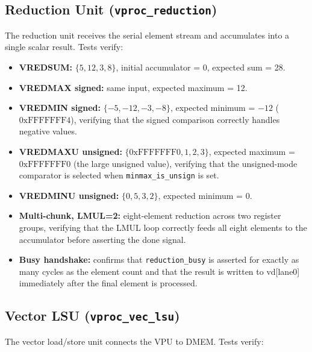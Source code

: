 \subsection{Reduction Unit (\texttt{vproc\_reduction})}

The reduction unit receives the serial element stream and accumulates into a single
scalar result. Tests verify:

\begin{itemize}
  \item \textbf{VREDSUM:} $\{5, 12, 3, 8\}$, initial accumulator = 0, expected sum = 28.
  \item \textbf{VREDMAX signed:} same input, expected maximum = 12.
  \item \textbf{VREDMIN signed:} $\{-5, -12, -3, -8\}$, expected minimum = $-12$
        ($0\mathrm{xFFFFFFF4}$), verifying that the signed comparison correctly handles
        negative values.
  \item \textbf{VREDMAXU unsigned:} $\{0\mathrm{xFFFFFFF0}, 1, 2, 3\}$, expected
        maximum = $0\mathrm{xFFFFFFF0}$ (the large unsigned value), verifying that the
        unsigned-mode comparator is selected when \texttt{minmax\_is\_unsign} is set.
  \item \textbf{VREDMINU unsigned:} $\{0, 5, 3, 2\}$, expected minimum = 0.
  \item \textbf{Multi-chunk, LMUL=2:} eight-element reduction across two register groups,
        verifying that the LMUL loop correctly feeds all eight elements to the accumulator
        before asserting the done signal.
  \item \textbf{Busy handshake:} confirms that \texttt{reduction\_busy} is asserted
        for exactly as many cycles as the element count and that the result is written
        to vd[lane0] immediately after the final element is processed.
\end{itemize}

\subsection{Vector LSU (\texttt{vproc\_vec\_lsu})}

The vector load/store unit connects the VPU to DMEM. Tests verify:

